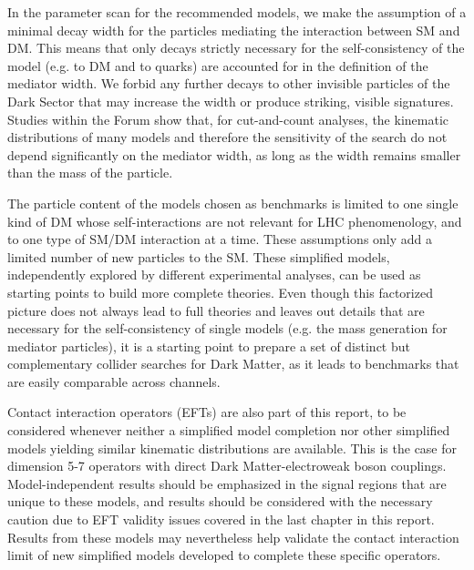 In the parameter scan for the recommended models, we make the
assumption of a minimal decay width for the particles mediating the
interaction between SM and DM.  This means that only decays
strictly necessary for the self-consistency of the model (e.g.  to DM
and to quarks) are accounted for in the definition of the mediator
width. We forbid any further decays to other invisible particles of
the Dark Sector that may increase the width or produce striking, visible signatures. Studies within the Forum
show that, for cut-and-count analyses, the kinematic distributions of
many models and therefore the sensitivity of the search do not depend
significantly on the mediator width, as long as the width remains smaller
than the mass of the particle.


The particle content of the models chosen as benchmarks is limited to
one single kind of DM whose self-interactions are not relevant for LHC
phenomenology, and to one type of SM/DM interaction at a time. These
assumptions only add a limited number of new particles to the
SM. These simplified models, independently explored by different
experimental analyses, can be used as starting points to build more
complete theories. Even though this factorized picture does not always
lead to full theories and leaves out details that are necessary for
the self-consistency of single models (e.g. the mass generation for
mediator particles), it is a starting point to prepare a set of
distinct but complementary collider searches for Dark Matter, as
it leads to benchmarks that are easily comparable across channels.

Contact interaction operators (EFTs) are also part of this report, 
to be considered whenever neither a simplified model completion 
nor other simplified models 
yielding similar kinematic distributions are available. 
This is the case for dimension 5-7 operators with direct 
Dark Matter-electroweak boson couplings. 
Model-independent results should be emphasized 
in the signal regions that are unique to these models, 
and results should be considered with the necessary caution due to EFT 
validity issues covered in the last chapter in this report. 
Results from these models may nevertheless help validate the 
contact interaction limit of new simplified models developed to complete 
these specific operators. 

